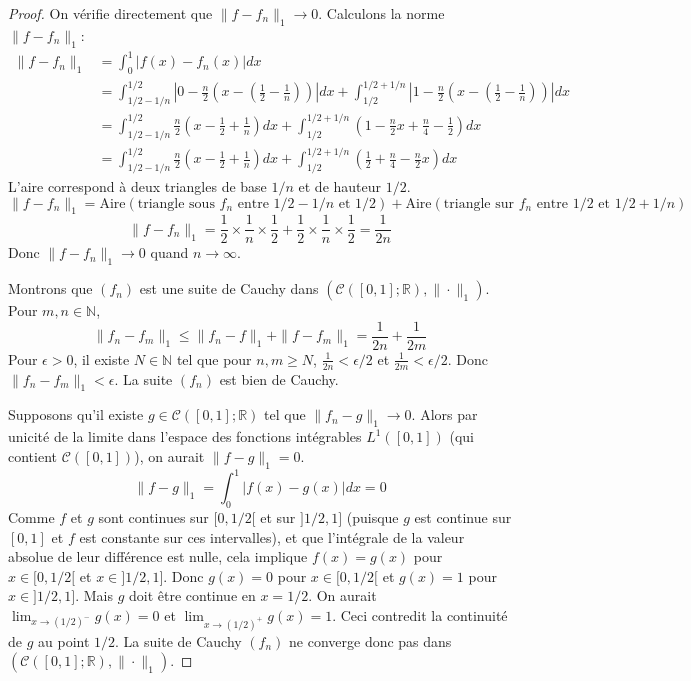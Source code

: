 \documentclass{article}
\newcommand{\R}{\mathbb{R}}
\newcommand{\N}{\mathbb{N}}
\begin{document}
\begin{proof}
On vérifie directement que $\|f - f_n\|_1 \to 0$. Calculons la norme $\|f - f_n\|_1$:
\begin{align*}
\|f - f_n\|_1 &= \int_0^1 |f(x) - f_n(x)| dx \\
&= \int_{1/2 - 1/n}^{1/2} \left|0 - \frac{n}{2}(x - (\frac{1}{2} - \frac{1}{n}))\right| dx + \int_{1/2}^{1/2 + 1/n} \left|1 - \frac{n}{2}(x - (\frac{1}{2} - \frac{1}{n}))\right| dx \\
&= \int_{1/2 - 1/n}^{1/2} \frac{n}{2}(x - \frac{1}{2} + \frac{1}{n}) dx + \int_{1/2}^{1/2 + 1/n} \left(1 - \frac{n}{2}x + \frac{n}{4} - \frac{1}{2}\right) dx \\
&= \int_{1/2 - 1/n}^{1/2} \frac{n}{2}(x - \frac{1}{2} + \frac{1}{n}) dx + \int_{1/2}^{1/2 + 1/n} \left(\frac{1}{2} + \frac{n}{4} - \frac{n}{2}x\right) dx
\end{align*}
L'aire correspond à deux triangles de base $1/n$ et de hauteur $1/2$.
\[ \|f - f_n\|_1 = \text{Aire}(\text{triangle sous } f_n \text{ entre } 1/2-1/n \text{ et } 1/2) + \text{Aire}(\text{triangle sur } f_n \text{ entre } 1/2 \text{ et } 1/2+1/n) \]
\[ \|f - f_n\|_1 = \frac{1}{2} \times \frac{1}{n} \times \frac{1}{2} + \frac{1}{2} \times \frac{1}{n} \times \frac{1}{2} = \frac{1}{2n} \]
Donc $\|f - f_n\|_1 \to 0$ quand $n \to \infty$.

Montrons que $(f_n)$ est une suite de Cauchy dans $(\mathcal{C}([0, 1]; \R), \|\cdot\|_1)$. Pour $m, n \in \N$,
\[ \|f_n - f_m\|_1 \leq \|f_n - f\|_1 + \|f - f_m\|_1 = \frac{1}{2n} + \frac{1}{2m} \]
Pour $\epsilon > 0$, il existe $N \in \N$ tel que pour $n, m \geq N$, $\frac{1}{2n} < \epsilon/2$ et $\frac{1}{2m} < \epsilon/2$. Donc $\|f_n - f_m\|_1 < \epsilon$. La suite $(f_n)$ est bien de Cauchy.

Supposons qu'il existe $g \in \mathcal{C}([0, 1]; \R)$ tel que $\|f_n - g\|_1 \to 0$. Alors par unicité de la limite dans l'espace des fonctions intégrables $L^1([0,1])$ (qui contient $\mathcal{C}([0, 1])$), on aurait $\|f - g\|_1 = 0$.
\[ \|f - g\|_1 = \int_0^1 |f(x) - g(x)| dx = 0 \]
Comme $f$ et $g$ sont continues sur $[0, 1/2[$ et sur $]1/2, 1]$ (puisque $g$ est continue sur $[0,1]$ et $f$ est constante sur ces intervalles), et que l'intégrale de la valeur absolue de leur différence est nulle, cela implique $f(x) = g(x)$ pour $x \in [0, 1/2[$ et $x \in ]1/2, 1]$.
Donc $g(x) = 0$ pour $x \in [0, 1/2[$ et $g(x) = 1$ pour $x \in ]1/2, 1]$.
Mais $g$ doit être continue en $x=1/2$. On aurait $\lim_{x \to (1/2)^-} g(x) = 0$ et $\lim_{x \to (1/2)^+} g(x) = 1$. Ceci contredit la continuité de $g$ au point $1/2$.
La suite de Cauchy $(f_n)$ ne converge donc pas dans $(\mathcal{C}([0, 1]; \R), \|\cdot\|_1)$.
\end{proof}
\end{document}
